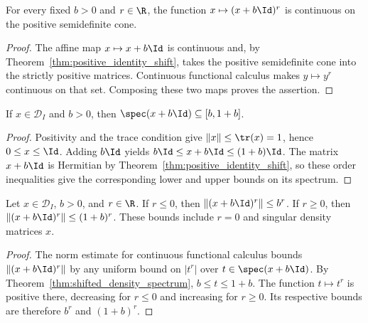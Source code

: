 \begin{theorem}
    \label{thm:shifted_real_power_continuous}
    \leanok
    For every fixed $b>0$ and $r\in\R$, the function
    $x\mapsto(x+b\Id)^r$ is continuous on the positive semidefinite cone.
\end{theorem}

\begin{proof}
    \leanok
    The affine map $x\mapsto x+b\Id$ is continuous and, by
    Theorem~\ref{thm:positive_identity_shift}, takes the positive
    semidefinite cone into the strictly positive matrices. Continuous
    functional calculus makes $y\mapsto y^r$ continuous on that set.
    Composing these two maps proves the assertion.
\end{proof}

\begin{theorem}
    \label{thm:shifted_density_spectrum}
    \leanok
    If $x\in\mathcal D_I$ and $b>0$, then
    $\spec(x+b\Id)\subseteq[b,1+b]$.
\end{theorem}

\begin{proof}
    \leanok
    Positivity and the trace condition give
    $\|x\|\le\tr(x)=1$, hence $0\le x\le\Id$.
    Adding $b\Id$ yields
    $b\Id\le x+b\Id\le(1+b)\Id$.
    The matrix $x+b\Id$ is Hermitian by
    Theorem~\ref{thm:positive_identity_shift}, so these order inequalities
    give the corresponding lower and upper bounds on its spectrum.
\end{proof}

\begin{theorem}
    \label{thm:shifted_density_power_norm}
    \leanok
    Let $x\in\mathcal D_I$, $b>0$, and $r\in\R$.
    If $r\le0$, then $\|(x+b\Id)^r\|\le b^r$.
    If $r\ge0$, then $\|(x+b\Id)^r\|\le(1+b)^r$.
    These bounds include $r=0$ and singular density matrices $x$.
\end{theorem}

\begin{proof}
    \leanok
    The norm estimate for continuous functional calculus bounds
    $\|(x+b\Id)^r\|$ by any uniform bound on $|t^r|$ over
    $t\in\spec(x+b\Id)$. By
    Theorem~\ref{thm:shifted_density_spectrum}, $b\le t\le1+b$.
    The function $t\mapsto t^r$ is positive there, decreasing for
    $r\le0$ and increasing for $r\ge0$. Its respective bounds are
    therefore $b^r$ and $(1+b)^r$.
\end{proof}
